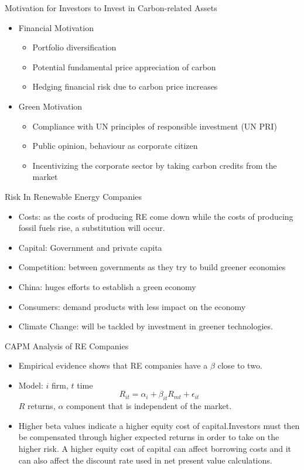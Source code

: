 {Motivation for Investors to Invest in Carbon-related Assets}
\begin{itemize}
\item<1-> Financial Motivation
\begin{itemize}
\item Portfolio diversification
\item Potential fundamental price appreciation of carbon
\item Hedging financial risk due to carbon price increases
\end{itemize}
\item<2-> Green Motivation
\begin{itemize}
\item Compliance with UN principles of responsible investment (UN PRI)
\item Public opinion, behaviour as corporate citizen
\item Incentivizing the corporate sector by taking carbon credits from the market
\end{itemize}
\end{itemize}

{Risk In Renewable Energy Companies}
\begin{itemize}
\item<1-> Costs: as the costs of producing RE come down while the costs of producing fossil fuels rise, a
substitution will occur.
\item<2-> Capital: Government and private capita
\item<3-> Competition: between governments as they try to build greener economies
\item<4-> China: huges efforts to establish a green economy
\item<5-> Consumers: demand products with less impact on the economy
\item<6-> Climate Change: will be tackled by investment in greener technologies.
\end{itemize}

{CAPM Analysis of RE Companies}
\begin{itemize}
\item<1-> Empirical evidence shows that RE companies have a $\beta$ close to two.
\item<2-> Model: $i$ firm, $t$ time
$$
R_{it}= \alpha_i + \beta_{it} R_{mt}+\epsilon_{it}
$$
$R$ returns, $\alpha$ component that is independent of the market.
\item<3-> Higher beta values indicate a higher equity cost of capital.Investors must then be compensated
through higher expected returns in order to take on the higher risk. A higher equity cost of capital can affect borrowing costs and
it can also affect the discount rate used in net present value calculations.
\end{itemize}


